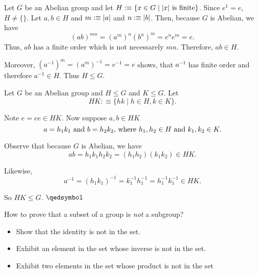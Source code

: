 \setcounter{example}{5}
\begin{example}
  Let $G$ be an Abelian group and let $H :\equiv \{ x \in G \mid \abs{x} \text{ is finite} \}$. Since $e^{1}=e$, $H \neq \{\}$. Let $a,b \in H$ and $m :\equiv \abs{a}$ and $n:\equiv \abs{b}$. Then, because $G$ is Abelian, we have
  \begin{equation}
    (ab)^{mn}=(a^m)^{n} (b^{n})^{m} = e^{n}e^{m}=e.
  \end{equation}
  Thus, $ab$ has a finite order which is not necessarely $mn$. Therefore, $ab \in H$.

  Moreover, $(a^{-1})^{m}=(a^m)^{-1} = e^{-1}=e$ shows, that $a^{-1}$ has finite order and therefore $a^{-1} \in H$. Thus $H \leq G$. \hfill \qedsymbol
\end{example}

\begin{example}
  Let $G$ be an Abelian group and $H \leq G$ and $K \leq G$. Let
  \begin{equation}
    HK :\equiv \{ hk \mid h\in H, k \in K \}.
  \end{equation}

  Note $e =ee \in HK.$ Now suppose $a,b \in HK$ \st
  \begin{equation}
    a=h_1k_1 $ and $ b=h_2k_2, $ where $h_1,h_2 \in H $ and $ k_1, k_2 \in K.
  \end{equation}

  Observe that because $G$ is Abelian, we have
  \begin{equation}
    ab = h_1k_1h_2k_2 = (h_1h_2)(k_1k_2) \in HK.
  \end{equation}

  Likewise,
  \begin{equation}
    a^{-1} = (h_1k_1)^{-1} = k_1^{-1} h_1^{-1} = h_1^{-1} k_1^{-1} \in HK.
  \end{equation}

  So $HK \leq G$. \hfill $\qedsymbol$
\end{example}

How to prove that a subset of a group is \emph{not} a subgroup?
\begin{itemize}
  \item Show that the identity is not in the set.
  \item Exhibit an element in the set whose inverse is not in the set.
  \item Exhibit two elements in the set whose product is not in the set
\end{itemize}


